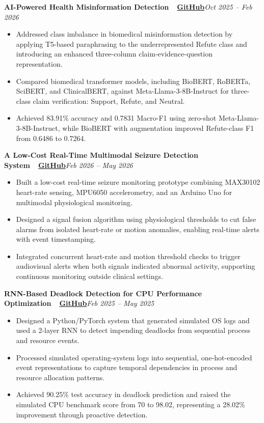 \documentclass[letterpaper,10.8pt]{article}
\newcommand{\resumeSubheadingTwo}[2]{
  \vspace{0pt}\item[]
    \textbf{#1}\hfill #2\par\nopagebreak\vspace{1pt}%
}
\begin{document}
    \newpage
    \resumeSubheadingTwo
      {AI-Powered Health Misinformation Detection\ \ \href{https://github.com/VIBHAS777/health-misinformation-ai-detection}{GitHub}}{\textit{Oct 2025 -- Feb 2026}}
    \begin{itemize}[leftmargin=*, itemsep=0.5pt, label={$\bullet$}]
      \item Addressed class imbalance in biomedical misinformation detection by applying T5-based paraphrasing to the underrepresented Refute class and introducing an enhanced three-column claim-evidence-question representation.
      \item Compared biomedical transformer models, including BioBERT, RoBERTa, SciBERT, and ClinicalBERT, against Meta-Llama-3-8B-Instruct for three-class claim verification: Support, Refute, and Neutral.
      \item Achieved 83.91\% accuracy and 0.7831 Macro-F1 using zero-shot Meta-Llama-3-8B-Instruct, while BioBERT with augmentation improved Refute-class F1 from 0.6486 to 0.7264.
    \end{itemize}

    \resumeSubheadingTwo
      {A Low-Cost Real-Time Multimodal Seizure Detection System\ \ \href{https://github.com/VIBHAS777/multimodal-seizure-detection-max30102}{GitHub}}{\textit{Feb 2026 -- May 2026}}
    \begin{itemize}[leftmargin=*, itemsep=0.5pt, label={$\bullet$}]
      \item Built a low-cost real-time seizure monitoring prototype combining MAX30102 heart-rate sensing, MPU6050 accelerometry, and an Arduino Uno for multimodal physiological monitoring.
      \item Designed a signal fusion algorithm using physiological thresholds to cut false alarms from isolated heart-rate or motion anomalies, enabling real-time alerts with event timestamping.
      \item Integrated concurrent heart-rate and motion threshold checks to trigger audiovisual alerts when both signals indicated abnormal activity, supporting continuous monitoring outside clinical settings.
    \end{itemize}

    \resumeSubheadingTwo
      {RNN-Based Deadlock Detection for CPU Performance Optimization\ \ \href{https://github.com/VIBHAS777/rnn-deadlock-detection}{GitHub}}{\textit{Feb 2025 -- May 2025}}
    \begin{itemize}[leftmargin=*, itemsep=0.5pt, label={$\bullet$}]
      \item Designed a Python/PyTorch system that generated simulated OS logs and used a 2-layer RNN to detect impending deadlocks from sequential process and resource events.
      \item Processed simulated operating-system logs into sequential, one-hot-encoded event representations to capture temporal dependencies in process and resource allocation patterns.
      \item Achieved 90.25\% test accuracy in deadlock prediction and raised the simulated CPU benchmark score from 70 to 98.02, representing a 28.02\% improvement through proactive detection.
    \end{itemize}
\end{document}
